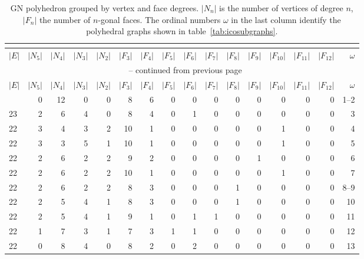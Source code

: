 \footnotesize{\begin{longtable}{l@{\hskip 4pt}r@{\hskip 4pt}r@{\hskip 4pt}r@{\hskip 4pt}r@{\hskip 4pt}r@{\hskip 4pt}r@{\hskip 4pt}r@{\hskip 4pt}r@{\hskip 4pt}r@{\hskip 4pt}r@{\hskip 4pt}r@{\hskip 4pt}r@{\hskip 4pt}r@{\hskip 4pt}r@{\hskip 8pt}r}
    \caption{\acs{GN} polyhedron grouped by vertex and face degrees. $|N_n|$ is the
    number of vertices of degree $n$, $|F_n|$ the number of $n$-gonal faces.
    The ordinal numbers $\omega$ in the last column identify the polyhedral
    graphs shown in table~\ref{tab:icosubgraphs}.}\\
    \label{tab:verticesandfaces}\\
\toprule    
    $|E|$ & $|N_5|$ & $|N_4|$ & $|N_3|$ & $|N_2|$ & $|F_3|$ & $|F_4|$ & $|F_5|$ & $|F_6|$ & $|F_7|$ & $|F_8|$ & $|F_9|$ & $|F_{10}|$ & $|F_{11}|$ & $|F_{12}|$ & $\omega$ \\\midrule
\endfirsthead
\multicolumn{16}{c}{\tablename~\thetable{} -- continued from previous page}\\
\toprule
    $|E|$ & $|N_5|$ & $|N_4|$ & $|N_3|$ & $|N_2|$ & $|F_3|$ & $|F_4|$ & $|F_5|$ & $|F_6|$ & $|F_7|$ & $|F_8|$ & $|F_9|$ & $|F_{10}|$ & $|F_{11}|$ & $|F_{12}|$ & $\omega$ \\\midrule
\endhead
\bottomrule\endfoot
    24 & 0  & 12 & 0  & 0  & 8  & 6  & 0  & 0  & 0  & 0  & 0  & 0  & 0  & 0  & 1--2\\
    23 & 2  & 6  & 4  & 0  & 8  & 4  & 0  & 1  & 0  & 0  & 0  & 0  & 0  & 0  & 3  \\
    22 & 3  & 4  & 3  & 2  & 10 & 1  & 0  & 0  & 0  & 0  & 0  & 1  & 0  & 0  & 4  \\
    22 & 3  & 3  & 5  & 1  & 10 & 1  & 0  & 0  & 0  & 0  & 0  & 1  & 0  & 0  & 5  \\
    22 & 2  & 6  & 2  & 2  & 9  & 2  & 0  & 0  & 0  & 0  & 1  & 0  & 0  & 0  & 6  \\
    22 & 2  & 6  & 2  & 2  & 10 & 1  & 0  & 0  & 0  & 0  & 0  & 1  & 0  & 0  & 7  \\
    22 & 2  & 6  & 2  & 2  & 8  & 3  & 0  & 0  & 0  & 1  & 0  & 0  & 0  & 0  & 8--9\\
    22 & 2  & 5  & 4  & 1  & 8  & 3  & 0  & 0  & 0  & 1  & 0  & 0  & 0  & 0  & 10 \\
    22 & 2  & 5  & 4  & 1  & 9  & 1  & 0  & 1  & 1  & 0  & 0  & 0  & 0  & 0  & 11\\
    22 & 1  & 7  & 3  & 1  & 7  & 3  & 1  & 1  & 0  & 0  & 0  & 0  & 0  & 0  & 12 \\
    22 & 0  & 8  & 4  & 0  & 8  & 2  & 0  & 2  & 0  & 0  & 0  & 0  & 0  & 0  & 13\\

\end{longtable}}

